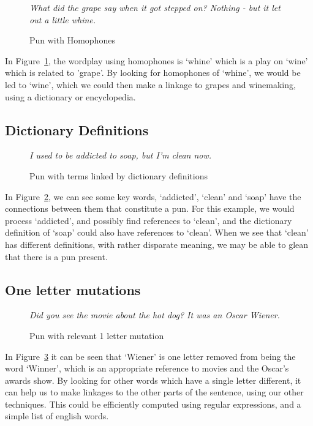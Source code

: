 \begin{figure}[h]
\begin{mdframed}
  \emph{What did the grape say when it got stepped on? Nothing - but it let out a little whine.}
  \caption{Pun with Homophones}
 \label{punhomophone}
\end{mdframed}
\end{figure}

In Figure~\ref{punhomophone}, the wordplay using homophones is `whine' which is a play on `wine' which is related to 'grape'. By looking for homophones of `whine', we would be led to `wine', which we could then make a linkage to grapes and winemaking, using a dictionary or encyclopedia.

\subsection{Dictionary Definitions}

\begin{figure}[h]
\begin{mdframed}
  \emph{I used to be addicted to soap, but I'm clean now.}
  \caption{Pun with terms linked by dictionary definitions}
 \label{addicted}
\end{mdframed}
\end{figure}

In Figure~\ref{addicted}, we can see some key words, `addicted', `clean' and `soap' have the connections between them that constitute a pun. For this example, we would process `addicted', and possibly find references to `clean', and the dictionary definition of `soap' could also have references to `clean'. When we see that `clean' has different definitions, with rather disparate meaning, we may be able to glean that there is a pun present.

\subsection{One letter mutations}

\begin{figure}[h]
\begin{mdframed}
  \emph{Did you see the movie about the hot dog? It was an Oscar Wiener.}
  \caption{Pun with relevant 1 letter mutation}
 \label{punmutation}
\end{mdframed}
\end{figure}

In Figure~\ref{punmutation} it can be seen that `Wiener'  is one letter removed from being the word `Winner', which is an appropriate reference to movies and the Oscar's awards show. By looking for other words which have a single letter different, it can help us to make linkages to the other parts of the sentence, using our other techniques. This could be efficiently computed using regular expressions, and a simple list of english words.

